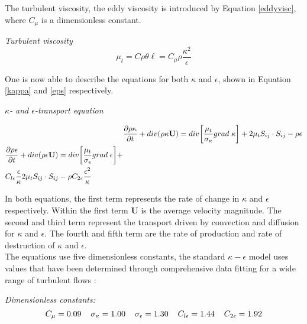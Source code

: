 \documentclass{CFD2017}
\begin{document}
The turbulent viscosity, the eddy viscosity is introduced by Equation \ref{eddyvisc}, where $C_{\mu}$ is a dimensionless constant.\vspace{2mm}

\emph{Turbulent viscosity}
\begin{equation}
\label{eddyvisc}
\mu_t=C\rho \theta \ell=C_{\mu}\rho\frac{\kappa^2}{\epsilon}
\end{equation}

One is now able to describe the equations for both $\kappa$ and $\epsilon$, shown in Equation \ref{kappa} and \ref{eps} respectively.\vspace{2mm}

\emph{$\kappa$- and $\epsilon$-transport equation}

\begin{align}
&\frac{\partial \rho \kappa}{\partial t} + div(\rho \kappa \mathbf{U}) = div\bigg[\frac{\mu_t}{\sigma_{\kappa}}grad\hspace{1mm}\kappa\bigg] +2\mu_tS_{ij}\cdot S_{ij}-\rho\epsilon \label{kappa}\\
\begin{split}
&\frac{\partial \rho \epsilon}{\partial t} + div(\rho \epsilon \mathbf{U}) = div\bigg[\frac{\mu_t}{\sigma_{\epsilon}}grad\hspace{1mm}\epsilon\bigg] +\\
&C_{l\epsilon} \frac{\epsilon}{\kappa}2\mu_tS_{ij}\cdot S_{ij}-\rho C_{2\epsilon}\frac{\epsilon^2}{\kappa} \label{eps}
\end{split}
\end{align}

In both equations, the first term represents the rate of change in $\kappa$ and $\epsilon$ respectively. Within the first term $\mathbf{U}$ is the average velocity magnitude. The second and third term represent the transport driven by convection and diffusion for $\kappa$ and $\epsilon$. The fourth and fifth term are the rate of production and rate of destruction of $\kappa$ and $\epsilon$.\\
The equations use five dimensionless constants, the standard $\kappa-\epsilon$ model uses values that have been determined through comprehensive data fitting for a wide range of turbulent flows \cite{Versteeg2007}:\vspace{2mm}

\emph{Dimensionless constants:}
\begin{equation*}
\label{dimConst}
C_{\mu}=0.09 \hspace{4mm} \sigma_{\kappa}=1.00\hspace{4mm}\sigma_{\epsilon}=1.30\hspace{4mm}C_{l\epsilon}=1.44\hspace{4mm}C_{2\epsilon}=1.92
\end{equation*}
\end{document}
